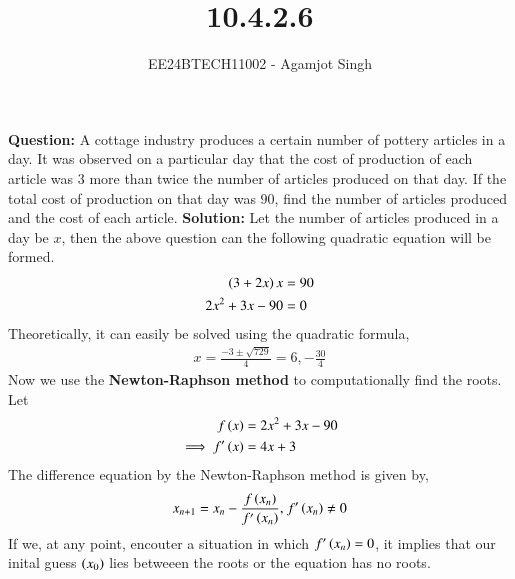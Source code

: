 \documentclass[journal]{IEEEtran}
\begin{document}

\vspace{3cm}

\title{10.4.2.6}
\author{EE24BTECH11002 - Agamjot Singh}
{\let\newpage\relax\maketitle}

\renewcommand{\thefigure}{\theenumi}
\renewcommand{\thetable}{\theenumi}
\setlength{\intextsep}{10pt} %

\textbf{Question:}
\newline
A cottage industry produces a certain number of pottery articles in a day. It was observed on a particular day that the cost of production of each article  was $3$ more than twice the number of articles produced on that day. If the total cost of production on that day was $90$, find the number of articles produced and the cost of each article.
\newline
\textbf{Solution:}
\newline
Let the number of articles produced in a day be $x$, then the above question can the following quadratic equation will be formed.
\begin{align}
  \left(3 + 2x\right)x &= 90\\
  2x^2 + 3x - 90 &= 0
\end{align}
Theoretically, it can easily be solved using the quadratic formula,
\begin{align}
  x = \frac{-3 \pm \sqrt{729}}{4} = 6, -\frac{30}{4}
\end{align}
Now we use the \textbf{Newton-Raphson method} to computationally find the roots.
\newline
Let 
\begin{align}
  f\left(x\right) &= 2x^2 + 3x - 90\\
  \implies f^{\prime}\left(x\right) &= 4x + 3
\end{align}
The difference equation by the Newton-Raphson method is given by,
\begin{align}
  x_{n + 1} = x_n - \frac{f\left(x_n\right)}{f^{\prime}\left(x_n\right)} \text{, } f^{\prime}\left(x_n\right) \neq 0
\end{align}
If we, at any point, encouter a situation in which $f^{\prime}\left(x_n\right) = 0$, it implies that our inital guess $\left(x_0\right)$ lies betweeen the roots or the equation has no roots.
\end{document}
